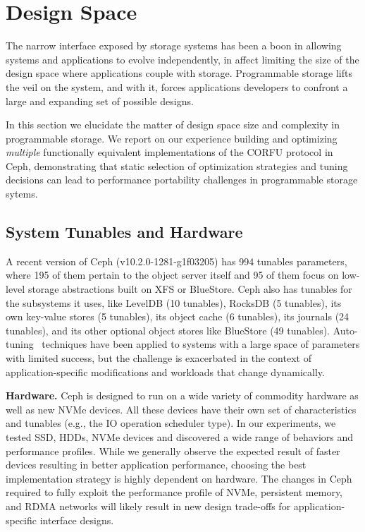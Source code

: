 \section{Design Space}
\label{sec:dspace}

The narrow interface exposed by storage systems has been a boon in allowing
systems and applications to evolve independently, in affect limiting the size
of the design space where applications couple with storage. Programmable
storage lifts the veil on the system, and with it, forces applications developers
to confront a large and expanding set of possible designs.

In this section we elucidate the matter of design space size and complexity in
programmable storage. We report on our experience building and optimizing
\emph{multiple} functionally equivalent implementations of the CORFU protocol
in Ceph, demonstrating that static selection of optimization strategies and tuning
decisions can lead to performance portability challenges in programmable
storage sytems.

\subsection{System Tunables and Hardware}

A recent version of Ceph (v10.2.0-1281-g1f03205) has 994 tunables parameters,
where 195 of them pertain to the object server itself and 95 of them focus on
low-level storage abstractions built on XFS or BlueStore.  Ceph also has
tunables for the subsystems it uses, like LevelDB (10 tunables), RocksDB (5
tunables), its own key-value stores (5 tunables), its object cache (6
tunables), its journals (24 tunables), and its other optional object stores
like BlueStore (49 tunables).  Auto-tuning~\cite{behzad:sc2013-autotuning}
techniques have been applied to systems with a large space of parameters with
limited success, but the challenge is exacerbated in the context of
application-specific modifications and workloads that change dynamically.

{\bf Hardware.} Ceph is designed to run on a wide variety of commodity
hardware as well as new NVMe devices. All these devices have their own set of
characteristics and tunables (e.g., the IO operation scheduler type). In our
experiments, we tested SSD, HDDs, NVMe devices and discovered a wide range of
behaviors and performance profiles. While we generally observe the expected
result of faster devices resulting in better application performance, choosing
the best implementation strategy is highly dependent on hardware. The changes
in Ceph required to fully exploit the performance profile of NVMe, persistent
memory, and RDMA networks will likely result in new design trade-offs for
application-specific interface designs.

